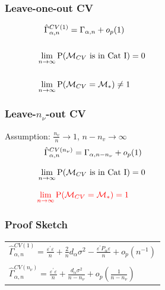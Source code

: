 \documentclass[20pt,mathserif,xcolor=dvipsnames]{beamer}
\begin{document}
\begin{frame}
\frametitle{Leave-one-out CV}
\begin{align*}
	&\hspace{0.3cm}\hat{\Gamma}^{CV(1)} _{\alpha,n}=\Gamma_{\alpha,n}+o_p(1)&\hspace{5cm}&\\\\
	&\lim_{n\rightarrow\infty}\mathrm{P}(\mathcal{M}_{CV} \text{ is in Cat I})=0&&\\\\
	&\lim_{n\rightarrow\infty}\mathrm{P}(\mathcal{M}_{CV}=\mathcal{M}_\ast )\neq1&&
\end{align*}
\end{frame}

\begin{frame}
\frametitle{Leave-$n_\nu$-out CV}
Assumption: $\frac{n_v}{n}\to 1$, $n-n_v\to \infty$
\begin{align*}
&\hspace{0.3cm}\hat{\Gamma}^{CV(n_\nu)}_{\alpha,n}=\Gamma_{\alpha,n-n_\nu}+o_p(1)&\hspace{5cm}&\\[8pt]
&\lim_{n\rightarrow\infty}\mathrm{P}(\mathcal{M}_{CV} \text{ is in Cat I})=0&&\\[8pt]
&{\color{red}\lim_{n\rightarrow\infty}\mathrm{P}(\mathcal{M}_{CV}=\mathcal{M}_\ast )=1}&&
\end{align*}
\end{frame}

\begin{frame}
\frametitle{Proof Sketch}
\setlength{\tabcolsep}{1pt}
\begin{tabular}{l}
$\hat{\Gamma}^{CV(1)}_{\alpha,n}=\frac{\varepsilon^\prime\varepsilon}{n}+\frac{2}{n}d_\alpha\sigma^2-\frac{\varepsilon^\prime P_\alpha\varepsilon}{n}+o_p(n^{-1})$\\\\
$\hat{\Gamma}^{CV(n_\nu)}_{\alpha,n}=\frac{\varepsilon^\prime\varepsilon}{n}+\frac{d_\alpha\sigma^2}{n-n_\nu}+o_p\left(\frac{1}{n-n_\nu}\right)$
\end{tabular}
\end{frame}
\end{document}
